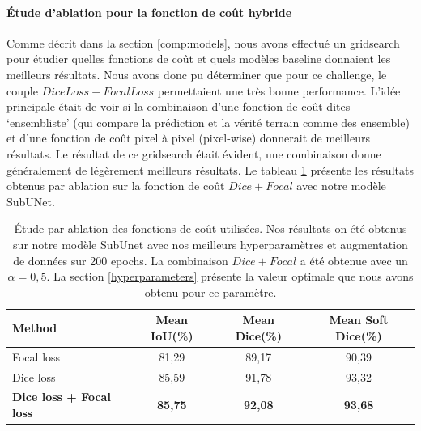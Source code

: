 \documentclass[french, english]{article}
\begin{document}
\paragraph{Étude d'ablation pour la fonction de coût hybride}
\label{loss_ablation}
Comme décrit dans la section \ref{comp:models}, nous avons effectué un gridsearch pour étudier quelles fonctions de coût et quels modèles baseline donnaient les meilleurs résultats. Nous avons donc pu déterminer que pour ce challenge, le couple \(Dice Loss + Focal Loss\) permettaient une très bonne performance. L'idée principale était de voir si la combinaison d'une fonction de coût dites `ensembliste' (qui compare la prédiction et la vérité terrain comme des ensemble) et d'une fonction de coût pixel à pixel (pixel-wise) donnerait de meilleurs résultats. Le résultat de ce gridsearch était évident, une combinaison donne généralement de légèrement meilleurs résultats. Le tableau \ref{tab:ablation:loss} présente les résultats obtenus par ablation sur la fonction de coût \(Dice + Focal\) avec notre modèle SubUNet.

\begin{table}[H]
    \footnotesize
    \centering
    \begin{tabular}{ l c c c }
        \hline
        Method & Mean IoU(\%) & Mean Dice(\%) & Mean Soft Dice(\%) \\
        \hline\hline
        Focal loss & 81,29 & 89,17 & 90,39 \\
        Dice loss & 85,59 & 91,78 & 93,32 \\
        \textbf{Dice loss + Focal loss} & \textbf{85,75} & \textbf{92,08} & \textbf{93,68} \\
        \hline
    \end{tabular}
    \caption{Étude par ablation des fonctions de coût utilisées. Nos résultats on été obtenus sur notre modèle SubUnet avec nos meilleurs hyperparamètres et augmentation de données sur  200 epochs. La combinaison \(Dice + Focal\) a été obtenue avec un \(\alpha=0,5\). La section \ref{hyperparameters} présente la valeur optimale que nous avons obtenu pour ce paramètre.}
    \label{tab:ablation:loss}
\end{table}
\end{document}
